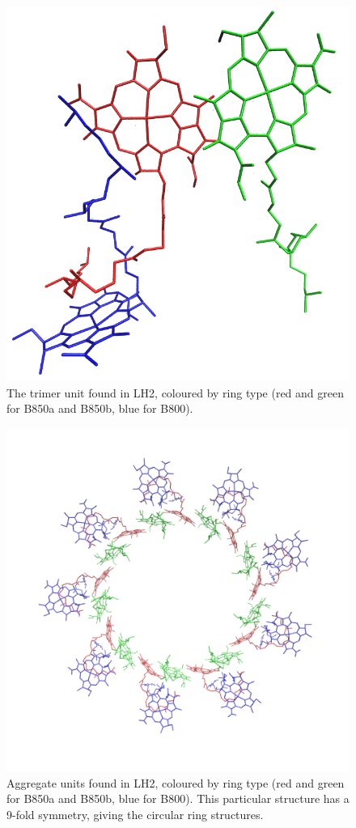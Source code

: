\begin{figure}
	\centering 
	\includegraphics[scale=0.3]{chapters/1_introduction/subunit.png}
	\caption{The trimer unit found in LH2, coloured by ring type (red and green
	for B850a and B850b, blue for B800).}
	\label{fig:LH2_subunit}
\end{figure}

\begin{figure}
	\centering 
	\includegraphics[scale=0.3]{chapters/1_introduction/ring_assign.png}
	\caption{Aggregate units found in LH2, coloured by ring type (red and green
	for B850a and B850b, blue for B800). This particular structure has a 9-fold
	symmetry, giving the circular ring structures.}
	\label{fig:LH2_rings}
\end{figure}

